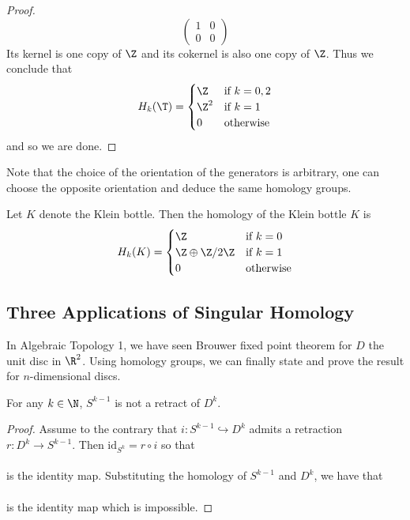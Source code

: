 \documentclass[a4paper]{article}
\begin{document}
\begin{eg}{}{}
\begin{proof}
$$\begin{pmatrix}
1 & 0\\
0 & 0
\end{pmatrix}$$ Its kernel is one copy of $\Z$ and its cokernel is also one copy of $\Z$. Thus we conclude that $$H_k(\T)=\begin{cases}
\Z & \text{if } k=0,2\\
\Z^2 & \text{if } k=1\\
0 & \text{otherwise}
\end{cases}$$
and so we are done. 
\end{proof}
\end{eg}

Note that the choice of the orientation of the generators is arbitrary, one can choose the opposite orientation and deduce the same homology groups. 

\begin{eg}{}{} Let $K$ denote the Klein bottle. Then the homology of the Klein bottle $K$ is $$H_k(K)=\begin{cases}
\Z & \text{if } k=0\\
\Z\oplus\Z/2\Z & \text{if } k=1\\
0 & \text{otherwise}
\end{cases}$$
\end{eg}

\subsection{Three Applications of Singular Homology}
In Algebraic Topology 1, we have seen Brouwer fixed point theorem for $D$ the unit disc in $\R^2$. Using homology groups, we can finally state and prove the result for $n$-dimensional discs. 

\begin{lmm}{}{} For any $k\in\N$, $S^{k-1}$ is not a retract of $D^k$. 
\begin{proof}
Assume to the contrary that $i:S^{k-1}\hookrightarrow D^k$ admits a retraction $r:D^k\to S^{k-1}$. Then $\text{id}_{S^k}=r\circ i$ so that \\
\\
is the identity map. Substituting the homology of $S^{k-1}$ and $D^k$, we have that \\
\\
is the identity map which is impossible. 
\end{proof}
\end{lmm}
\end{document}
